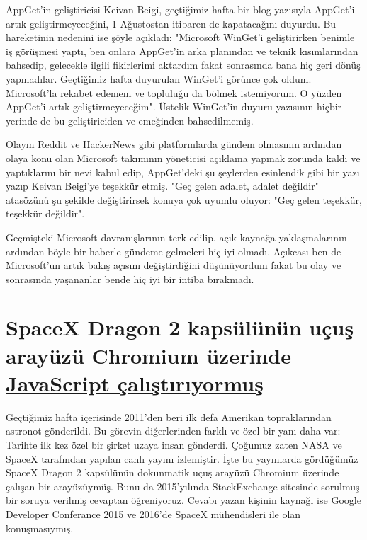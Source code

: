 \documentclass[11pt]{article}
\begin{document}
AppGet'in geliştiricisi Keivan Beigi, geçtiğimiz hafta bir blog yazısıyla
AppGet'i artık geliştirmeyeceğini, 1 Ağustostan itibaren de kapatacağını
duyurdu. Bu hareketinin nedenini ise şöyle açıkladı: "Microsoft WinGet'i
geliştirirken benimle iş görüşmesi yaptı, ben onlara AppGet'in arka planından
ve teknik kısımlarından bahsedip, gelecekle ilgili fikirlerimi aktardım fakat
sonrasında bana hiç geri dönüş yapmadılar. Geçtiğimiz hafta duyurulan WinGet'i
görünce çok oldum. Microsoft'la rekabet edemem ve topluluğu da bölmek
istemiyorum. O yüzden AppGet'i artık geliştirmeyeceğim". Üstelik WinGet'in
duyuru yazısının hiçbir yerinde de bu geliştiriciden ve emeğinden
bahsedilmemiş.

Olayın Reddit ve HackerNews gibi platformlarda gündem olmasının ardından olaya
konu olan Microsoft takımının yöneticisi açıklama yapmak zorunda kaldı ve
yaptıklarını bir nevi kabul edip, AppGet'deki şu şeylerden esinlendik gibi bir
yazı yazıp Keivan Beigi'ye teşekkür etmiş. "Geç gelen adalet, adalet değildir"
atasözünü şu şekilde değiştirirsek konuya çok uyumlu oluyor: "Geç gelen
teşekkür, teşekkür değildir".

Geçmişteki Microsoft davranışlarının terk edilip, açık kaynağa yaklaşmalarının
ardından böyle bir haberle gündeme gelmeleri hiç iyi olmadı. Açıkcası ben de
Microsoft'un artık bakış açısını değiştirdiğini düşünüyordum fakat bu olay ve
sonrasında yaşananlar bende hiç iyi bir intiba bırakmadı.
\section{SpaceX Dragon 2 kapsülünün uçuş arayüzü Chromium üzerinde \href{https://space.stackexchange.com/questions/9243/what-computer-and-software-is-used-by-the-falcon-9/9446\#9446}{JavaScript çalıştırıyormuş}}
\label{sec:org5aea381}
Geçtiğimiz hafta içerisinde 2011'den beri ilk defa Amerikan topraklarından
astronot gönderildi. Bu görevin diğerlerinden farklı ve özel bir yanı daha
var: Tarihte ilk kez özel bir şirket uzaya insan gönderdi. Çoğumuz zaten NASA
ve SpaceX tarafından yapılan canlı yayını izlemiştir. İşte bu yayınlarda
gördüğümüz SpaceX Dragon 2 kapsülünün dokunmatik uçuş arayüzü Chromium
üzerinde çalışan bir arayüzüymüş. Bunu da 2015'yılında StackExchange sitesinde
sorulmuş bir soruya verilmiş cevaptan öğreniyoruz. Cevabı yazan kişinin
kaynağı ise Google Developer Conferance 2015 ve 2016'de SpaceX mühendisleri
ile olan konuşmasıymış.
\end{document}
